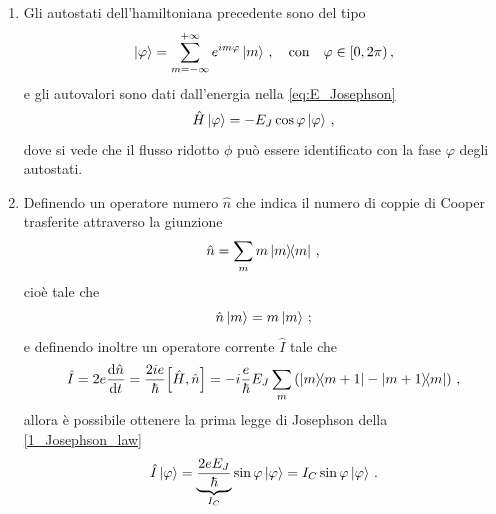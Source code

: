 \begin{enumerate}
    \item Gli autostati dell'hamiltoniana precedente sono del tipo
    \begin{equation*}
        \ket{\varphi}=\sum_{m=-\infty}^{+\infty}e^{im\varphi}\ket{m} \, , \quad \text{con} \quad \varphi \in [0,2\pi) \, ,
    \end{equation*}
    e gli autovalori sono dati dall'energia nella \eqref{eq:E_Josephson} 
    \begin{equation*}
        \hat H \ket{\varphi} = -E_J \cos\varphi\ket{\varphi} \, ,
    \end{equation*}
    dove si vede che il flusso ridotto $\phi$ pu\`o essere identificato con la fase $\varphi$ degli autostati.
    \item Definendo un operatore numero $\hat n$ che indica il numero di coppie di Cooper trasferite attraverso la giunzione
    \begin{equation*}
        \hat n = \sum_m m\op{m}{m} \, ,
    \end{equation*}
    cioè tale che
    \begin{equation*}
        \hat n \ket m = m \ket m \, ;
    \end{equation*}
    e definendo inoltre un operatore corrente $\hat{I}$ tale che
    \begin{equation*}
        \hat{I} = 2 e \dv{\hat{n}}{t} = \frac{2 i e}{\hbar} \comm{\hat{H}}{\hat{n}} =  -i\frac{e}{\hbar}E_J\sum_m \left( \op{m}{m+1}-\op{m+1}{m} \right) \, ,
    \end{equation*}
    allora è possibile ottenere la prima legge di Josephson della \eqref{1_Josephson_law}
    \begin{equation*}
        \hat I \ket{\varphi} = \underbrace{\frac{2eE_J}{\hbar}}_{I_C} \sin\varphi \ket\varphi = I_C \sin\varphi \ket{\varphi} \, .
    \end{equation*}
    

\end{enumerate}
